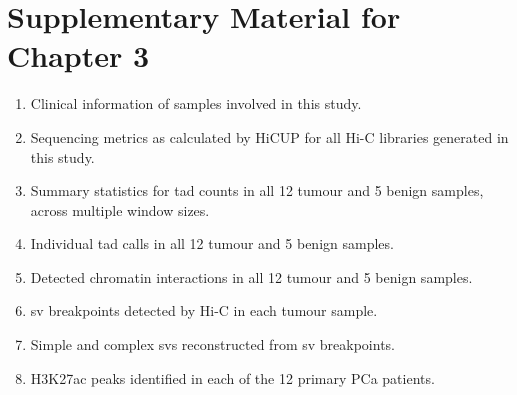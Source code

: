 \chapter{Supplementary Material for Chapter 3}

\begin{enumerate}
  \item Clinical information of samples involved in this study.\label{tab:3D_tab1}
  \item Sequencing metrics as calculated by HiCUP for all Hi-C libraries generated in this study.\label{tab:3D_tab2}
  \item Summary statistics for \gls{tad} counts in all 12 tumour and 5 benign samples, across multiple window sizes.\label{tab:3D_tab3}
  \item Individual \gls{tad} calls in all 12 tumour and 5 benign samples.\label{tab:3D_tab4}
  \item Detected chromatin interactions in all 12 tumour and 5 benign samples.\label{tab:3D_tab5}
  \item \gls{sv} breakpoints detected by Hi-C in each tumour sample.\label{tab:3D_tab6}
  \item Simple and complex \glspl{sv} reconstructed from \gls{sv} breakpoints.\label{tab:3D_tab7}
  \item H3K27ac peaks identified in each of the 12 primary PCa patients.\label{tab:3D_tab8}
\end{enumerate}


